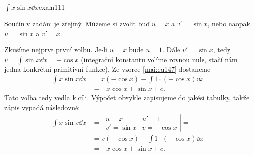 \begin{mathexam}{\(\int x\sin x\dd{x}\)}{exam111} 
  
  Součin v zadání je zřejmý. Můžeme si zvolit buď \(u=x\) a \(v'=\sin x\), nebo naopak \(u=\sin x\)
  a \(v'= x\).
  
  Zkusíme nejprve první volbu. Je-li \(u=x\) bude \(u=1\). Dále \(v'=\sin x\), tedy \(v=\int\sin
  x\dd{x} = -\cos x\) (integrační konstantu volíme rovnou nule, stačí nám jedna konkrétní primitivní
  funkce). Ze vzorce \eqref{mai:eq147} dostaneme
  \begin{align*}
    \int x\sin x\dd{x} &= x(-\cos x) - \int1\cdot(-\cos x)\dd{x} \\
                       &= -x\cos x + \sin x + c.
  \end{align*}  
  Tato volba tedy vedla k cíli. Výpočet obvykle zapisujeme do jakési tabulky, takže zápis vypadá
  následovně:
  \begin{align*}
    \int x\sin x\dd{x} &= %
      \left\lvert
        \begin{array}{ll} 
          u = x     & u' =1        \\
          v'=\sin x & v  = -\cos x 
        \end{array}  
      \right\rvert =                                              \\
                       & = x(-\cos x) - \int1\cdot(-\cos x)\dd{x} \\
                       &= -x\cos x + \sin x + c.
  \end{align*}  
\end{mathexam}